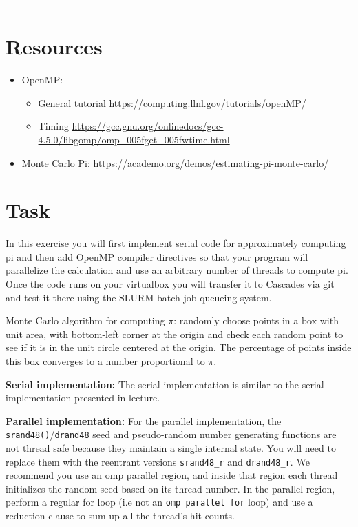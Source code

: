 \documentclass[letter]{article}
\begin{document}
\hrule

\pagebreak

\section*{Resources}

\begin{itemize}

    \item OpenMP:
        \begin{itemize}
            \item General tutorial  \url{https://computing.llnl.gov/tutorials/openMP/}
            \item Timing  \url{https://gcc.gnu.org/onlinedocs/gcc-4.5.0/libgomp/omp_005fget_005fwtime.html}
        \end{itemize}
    \item Monte Carlo Pi: \url{https://academo.org/demos/estimating-pi-monte-carlo/}

\end{itemize}

\section*{Task}
In this exercise you will first implement serial code for approximately computing pi and then add OpenMP compiler directives so that your program will parallelize the calculation and use an arbitrary number of threads to compute pi. Once the code runs on your virtualbox you will transfer it to Cascades via git and test it there using the SLURM batch job queueing system.

Monte Carlo algorithm for computing $\pi$: randomly choose points in a box with unit area, with bottom-left corner at the origin and check each random point to see if it is in the unit circle centered at the origin.  The percentage of points inside this box converges to a number proportional to $\pi$.

\textbf{Serial implementation:} The serial implementation is similar to the serial implementation presented in lecture. 

\textbf{Parallel implementation:}  For the parallel implementation, the \texttt{srand48()}/\texttt{drand48} seed and pseudo-random number generating functions are not thread safe because they maintain a single internal state. You will need to replace them with the reentrant versions \texttt{srand48\_r} and \texttt{drand48\_r}.  We recommend you use an omp parallel region, and inside that region each thread initializes the random seed based on its thread number.  In the parallel region, perform a regular for loop (i.e not an \texttt{omp parallel for} loop) and use a reduction clause to sum up all the thread’s hit counts.
\end{document}
